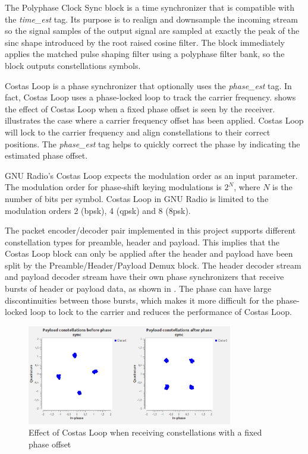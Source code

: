 The Polyphase Clock Sync block is a time synchronizer that is compatible with the \textit{time\_est} tag. Its purpose is to realign and downsample the incoming stream so the signal samples of the output signal are sampled at exactly the peak of the sinc shape introduced by the root raised cosine filter. The block immediately applies the matched pulse shaping filter using a polyphase filter bank, so the block outputs constellations symbols.\medskip

Costas Loop is a phase synchronizer that optionally uses the \textit{phase\_est} tag. In fact, Costas Loop uses a phase-locked loop to track the carrier frequency.  shows the effect of Costas Loop when a fixed phase offset is seen by the receiver.  illustrates the case where a carrier frequency offset has been applied. Costas Loop will lock to the carrier frequency and align constellations to their correct positions. The \textit{phase\_est} tag helps to quickly correct the phase by indicating the estimated phase offset.\medskip

GNU Radio's Costas Loop expects the modulation order as an input parameter. The modulation order for phase-shift keying modulations is \(2^{N}\), where $N$ is the number of bits per symbol. Costas Loop in GNU Radio is limited to the modulation orders 2 (\gls{bpsk}), 4 (\gls{qpsk}) and 8 (\gls{8psk}). \medskip

The packet encoder/decoder pair implemented in this project supports different constellation types for preamble, header and payload. This implies that the Costas Loop block can only be applied after the header and payload have been split by the Preamble/Header/Payload Demux block. The header decoder stream and payload decoder stream have their own phase synchronizers that receive bursts of header or payload data, as shown in . The phase can have large discontinuities between those bursts, which makes it more difficult for the phase-locked loop to lock to the carrier and reduces the performance of Costas Loop. \medskip


\begin{figure}[H]
    \centering
    \includegraphics[width=0.8\textwidth]{img_commchain/phase_sync.png}
    \caption{Effect of Costas Loop when receiving constellations with a fixed phase offset }
    \label{fig:costas_phase}
\end{figure}



